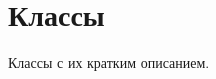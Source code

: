 \section{Классы}
Классы с их кратким описанием.\begin{DoxyCompactList}
\item{}
\end{DoxyCompactList}
